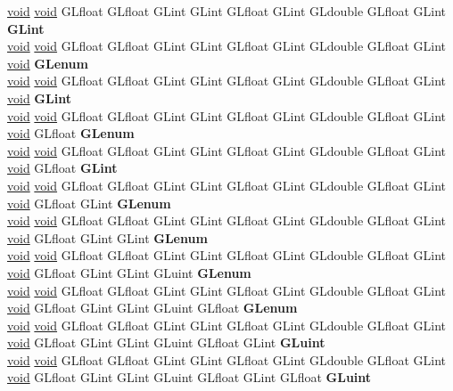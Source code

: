 \begin{DoxyCompactItemize}
\begin{tabbing}
\>\hyperlink{interfacevoid}{void} \hyperlink{interfacevoid}{void} GLfloat GLfloat GLint GLint GLfloat GLint GLdouble GLfloat GLint {\bfseries GLint}\\
\>\hyperlink{interfacevoid}{void} \hyperlink{interfacevoid}{void} GLfloat GLfloat GLint GLint GLfloat GLint GLdouble GLfloat GLint \hyperlink{interfacevoid}{void} {\bfseries GLenum}\\
\>\hyperlink{interfacevoid}{void} \hyperlink{interfacevoid}{void} GLfloat GLfloat GLint GLint GLfloat GLint GLdouble GLfloat GLint \hyperlink{interfacevoid}{void} {\bfseries GLint}\\
\>\hyperlink{interfacevoid}{void} \hyperlink{interfacevoid}{void} GLfloat GLfloat GLint GLint GLfloat GLint GLdouble GLfloat GLint \hyperlink{interfacevoid}{void} GLfloat {\bfseries GLenum}\\
\>\hyperlink{interfacevoid}{void} \hyperlink{interfacevoid}{void} GLfloat GLfloat GLint GLint GLfloat GLint GLdouble GLfloat GLint \hyperlink{interfacevoid}{void} GLfloat {\bfseries GLint}\\
\>\hyperlink{interfacevoid}{void} \hyperlink{interfacevoid}{void} GLfloat GLfloat GLint GLint GLfloat GLint GLdouble GLfloat GLint \hyperlink{interfacevoid}{void} GLfloat GLint {\bfseries GLenum}\\
\>\hyperlink{interfacevoid}{void} \hyperlink{interfacevoid}{void} GLfloat GLfloat GLint GLint GLfloat GLint GLdouble GLfloat GLint \hyperlink{interfacevoid}{void} GLfloat GLint GLint {\bfseries GLenum}\\
\>\hyperlink{interfacevoid}{void} \hyperlink{interfacevoid}{void} GLfloat GLfloat GLint GLint GLfloat GLint GLdouble GLfloat GLint \hyperlink{interfacevoid}{void} GLfloat GLint GLint GLuint {\bfseries GLenum}\\
\>\hyperlink{interfacevoid}{void} \hyperlink{interfacevoid}{void} GLfloat GLfloat GLint GLint GLfloat GLint GLdouble GLfloat GLint \hyperlink{interfacevoid}{void} GLfloat GLint GLint GLuint GLfloat {\bfseries GLenum}\\
\>\hyperlink{interfacevoid}{void} \hyperlink{interfacevoid}{void} GLfloat GLfloat GLint GLint GLfloat GLint GLdouble GLfloat GLint \hyperlink{interfacevoid}{void} GLfloat GLint GLint GLuint GLfloat GLint {\bfseries GLuint}\\
\>\hyperlink{interfacevoid}{void} \hyperlink{interfacevoid}{void} GLfloat GLfloat GLint GLint GLfloat GLint GLdouble GLfloat GLint \hyperlink{interfacevoid}{void} GLfloat GLint GLint GLuint GLfloat GLint GLfloat {\bfseries GLuint}\\

\end{tabbing}
\end{DoxyCompactItemize}
